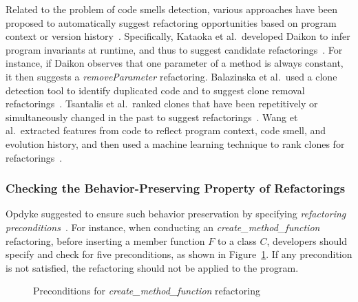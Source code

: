\documentclass[runningheads,a4paper]{llncs}
\begin{document}
Related to the problem of code smells detection, various approaches have been proposed to automatically suggest refactoring opportunities based on program context or version history~\cite{Balazinska2000:ACA,Kataoka2001:ASP,Higo2008:metricrefactoring,Tsantalis2011:rankRefactoring,Wang2014:recommendClones,Meng2015:ARO}. Specifically, Kataoka et al.~developed Daikon to infer program invariants at runtime, and thus to suggest candidate refactorings~\cite{Kataoka2001:ASP}. For instance, if Daikon observes that one parameter of a method is always constant, it then suggests a \emph{removeParameter} refactoring. Balazinska et al.~used a clone detection tool to identify duplicated code and to suggest clone removal refactorings~\cite{Balazinska2000:ACA}. Tsantalis et al.~ranked clones that have been repetitively or simultaneously changed in the past to suggest refactorings~\cite{Tsantalis2011:rankRefactoring}. Wang et al.~extracted features from code to reflect program context, code smell, and evolution history, and then used a machine learning technique to rank clones for refactorings~\cite{Wang2014:recommendClones}.


\subsubsection{Checking the Behavior-Preserving Property of Refactorings}Opdyke suggested to ensure such behavior preservation by specifying \emph{refactoring preconditions}~\cite{Opdyke1992:ROF}. For instance, when conducting an \emph{create\_method\_function} refactoring, before inserting a member function $F$ to a class $C$, developers should specify and check for five preconditions, as shown in Figure~\ref{fig:preconditions}. If any precondition is not satisfied, the refactoring should not be applied to the program.

\begin{figure}[!htb]
\centering
{}
\caption{Preconditions for \emph{create\_method\_function} refactoring~\cite{Opdyke1992:ROF}}
\label{fig:preconditions}
\end{figure}
\end{document}
